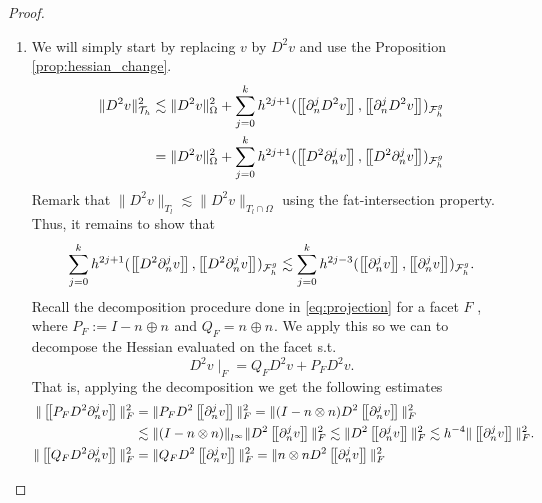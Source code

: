 \begin{proof}
\begin{enumerate}[label=\arabic*)]
    \item We will simply start by replacing $v$  by $D^2 v$ and use the Proposition \ref{prop:hessian_change}.
        \[
            \begin{split}
                    \| D^2 v \|_{ \mathcal{T} _{h} }^{2  }&  \lesssim \| D^2 v \|_{ \Omega  }^{ 2 }  + \sum_{j=0}^{k} h^{2j+1} ( \jump{   \partial ^{j}_{n} D^2 v }, \jump{  \partial ^{j}_{n} D^2 v}    )_{\mathcal{F}_{h}^{g}} \\
                    &=  \| D^2 v \|_{ \Omega  }^{ 2 }  + \sum_{j=0}^{k} h^{2j+1} ( \jump{   D^2 \partial ^{j}_{n}  v }, \jump{  D^2 \partial ^{j}_{n}  v}    )_{\mathcal{F}_{h}^{g}}
            \end{split}
        \]
        Remark that $\|  D^2 v \|_{ T_{l} }^{  } \lesssim  \|  D^2 v \|_{ T_{l} \cap \Omega  }^{  }  $ using the fat-intersection property.
        Thus, it remains to show that \[
        \sum_{j=0}^{k} h^{2j+1} ( \jump{   D^2 \partial ^{j}_{n}  v }, \jump{  D^2 \partial ^{j}_{n}  v}    )_{\mathcal{F}_{h}^{g}} \lesssim  \sum_{j=0}^{k} h^{2j-3} ( \jump{    \partial ^{j}_{n}  v }, \jump{  \partial ^{j}_{n}  v}
        )_{\mathcal{F}_{h}^{g}}.
        \]
        Recall the decomposition procedure done in \eqref{eq:projection} for a facet $F$ , where $P_{F} := I - n_{} \oplus n_{} $ and $Q_{F} = n_{} \oplus n_{}$. We apply this so we can to decompose the Hessian evaluated on the facet  s.t. \[
        D^2 v  \mid _{F} = Q_{F}D^2v + P_{F} D^2 v .
        \]
        That is, applying the decomposition we get the following estimates \[
            \begin{split}
        \| \jump{ P_{F}   D^2 \partial _{n}^{j} v }\|_{ F }^{ 2 } & = \| P_{F} D^2 \jump{ \partial _{n}^{j} v }   \|_{ F  }^{ 2} = \| (I- n\otimes n) D^2 \jump{ \partial _{n}^{j} v }   \|_{ F  }^{ 2}    \\
        & \lesssim  \|  (I- n\otimes n) \|_{l^{\infty} }^{  } \| D^2 \jump{ \partial _{n}^{j} v }   \|_{ F  }^{ 2} \lesssim   \|  D^2 \jump{ \partial _{n}^{j} v }   \|_{ F  }^{ 2} \lesssim h^{-4} \|  \jump{ \partial ^{j}_{n} v }   \|_{ F }^{  2}. \\
        \| \jump{ Q_{F}   D^2 \partial _{n}^{j} v }\|_{ F }^{ 2 } & = \| Q_{F} D^2 \jump{ \partial _{n}^{j} v }   \|_{ F  }^{ 2} = \| n\otimes n D^2 \jump{ \partial _{n}^{j} v }   \|_{ F  }^{ 2}    \\

\end{split}\]
\end{enumerate}
\end{proof}
